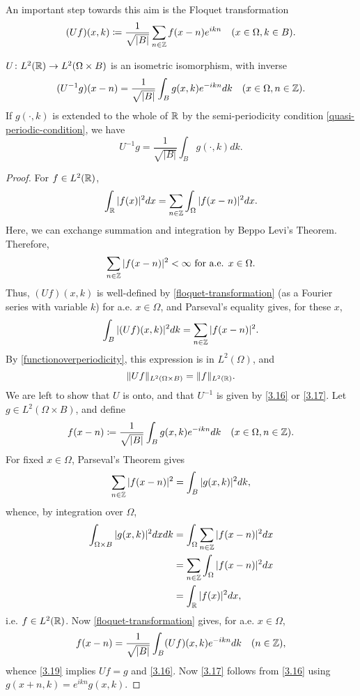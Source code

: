 An important step towards this aim is the Floquet transformation
	\begin{equation}
		(Uf)(x, k) \coloneqq \frac{1}{\sqrt{|B|}} \sum_{n \in \mathbb{Z}} f(x - n) e^{ikn} \quad (x \in \Omega, k \in B). \label{floquet-transformation}
	\end{equation}
		
\begin{theorem} \label{3.4.1}
	$ U \colon L^{2}(\mathbb{R}) \rightarrow L^{2}(\Omega \times B)$ is an isometric isomorphism, with inverse
		\begin{equation}
			(U^{-1}g)(x - n) = \frac{1}{\sqrt{|B|}} \int_{B} g(x, k) e^{-ikn} dk \quad (x \in \Omega, n \in \mathbb{Z}). \label{3.16}
		\end{equation} 
	If $g(\cdot, k)$ is extended to the whole of $\mathbb{R}$ by the semi-periodicity condition \eqref{quasi-periodic-condition}, we have
		\begin{equation}
			U^{-1} g = \frac{1}{\sqrt{|B|}} \int_{B} g(\cdot, k) dk. \label{3.17}
		\end{equation}
		
	\begin{proof}
		For $f \in L^{2}(\mathbb{R})$,
		\begin{equation}
			\int_{\mathbb{R}} |f(x)|^{2} dx = \sum_{n \in \mathbb{Z}} \int_{\Omega} |f(x - n)|^{2} dx. \label{functionoverperiodicity}
		\end{equation} 
		Here, we can exchange summation and integration by Beppo Levi's Theorem. Therefore, 
		\[ \sum_{n \in \mathbb{Z}} |f(x - n)|^{2} < \infty \text{ for a.e. } x \in \Omega.\]
		Thus, $(Uf)(x, k)$ is well-defined by \eqref{floquet-transformation} (as a Fourier series with variable $k$) for a.e. $x \in \Omega$, and Parseval's equality gives, for these $x$,
		\[ \int_{B}|(Uf)(x,k)|^{2} dk = \sum_{n \in \mathbb{Z}} |f(x - n)|^{2}. \]
		By \eqref{functionoverperiodicity}, this expression is in $L^{2}(\Omega)$, and
		\[ \| Uf \|_{L^{2}(\Omega \times B)} = \|f\|_{L^{2}(\mathbb{R})}. \]
		We are left to show that $U$ is onto, and that $U^{-1}$ is given by \eqref{3.16} or \eqref{3.17}. Let $g \in L^{2}(\Omega \times B)$, and define
		\begin{equation}
			f(x - n) \coloneqq \frac{1}{\sqrt{|B|}} \int_{B} g(x, k) e^{-ikn} dk \quad (x \in \Omega, n \in\mathbb{Z}).\label{3.19}
		\end{equation}
		For fixed $x \in \Omega$, Parseval's Theorem gives
		\[ \sum_{n \in \mathbb{Z}} |f(x - n)|^{2} = \int_{B} |g(x, k)|^{2} dk, \]
		whence, by integration over $\Omega$,
		\begin{eqnarray}
			\int_{\Omega \times B} |g(x, k)|^{2} dx dk & = \int_{\Omega} \sum_{n \in \mathbb{Z}} |f(x - n)|^{2} dx \\
				& = \sum_{n \in\mathbb{Z}} \int_{\Omega} |f(x-n)|^{2} dx \\
				& = \int_{\mathbb{R}} |f(x)|^{2} dx,	
		\end{eqnarray}
		i.e. $f \in L^{2}(\mathbb{R})$. Now \eqref{floquet-transformation} gives, for a.e. $x \in\Omega$,
		\[ f(x - n) = \frac{1}{\sqrt{|B|}} \int_{B} (Uf)(x,k) e^{-ikn} dk \quad (n \in \mathbb{Z}), \]
		whence \eqref{3.19} implies $U f = g$ and \eqref{3.16}. Now \eqref{3.17} follows from \eqref{3.16} using $g(x + n, k) = e^{ikn} g(x, k)$.
	\end{proof}				
\end{theorem}